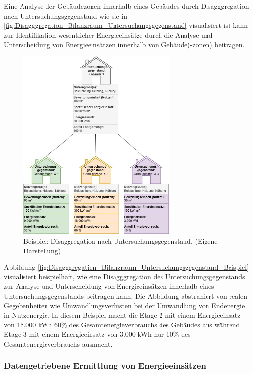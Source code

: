 Eine Analyse der Gebäudezonen innerhalb eines Gebäudes durch Disagggregation nach Untersuchungsgegenstand wie sie in 
\eqref{fig:Disagggregation_Bilanzraum_Untersuchungsgegenstand} visualisiert ist kann zur Identifikation wesentlicher Energieeinsätze durch die Analyse und Unterscheidung 
von Energieeinsätzen innerhalb von Gebäude(-zonen) beitragen.
\begin{figure}[H]
    \centering
    \includegraphics[width=0.7\textwidth]{../../Ressourcen/Abbildungen/Untersuchungsgegenstand_Zerlegt_Beispiel.jpg}
    \caption{Beispiel: Disaggregation nach Untersuchungsgegenstand. (Eigene Darstellung)}
    \label{fig:Disagggregation_Bilanzraum_Untersuchungsgegenstand_Beispiel}
\end{figure}
Abbildung \eqref{fig:Disagggregation_Bilanzraum_Untersuchungsgegenstand_Beispiel} visualisiert beispielhaft, wie eine Disagggregation des Untersuchungsgegenstands 
zur Analyse und Unterscheidung von Energieeinsätzen innerhalb eines Untersuchungsgegenstands beitragen kann.
Die Abbildung abstrahiert von realen Gegebenheiten wie Umwandlungsverlusten bei der Umwandlung von Endenergie in Nutzenergie.
In diesem Beispiel macht die Etage 2 mit einem Energieeinsatz von 18.000 kWh 60\% des Gesamtenergieverbrauchs des Gebäudes aus während Etage 3 mit 
einem Energieeinsatz von 3.000 kWh nur 10\% des Gesamtenergieverbrauchs ausmacht.

\subsubsection{Datengetriebene Ermittlung von Energieeinsätzen}

